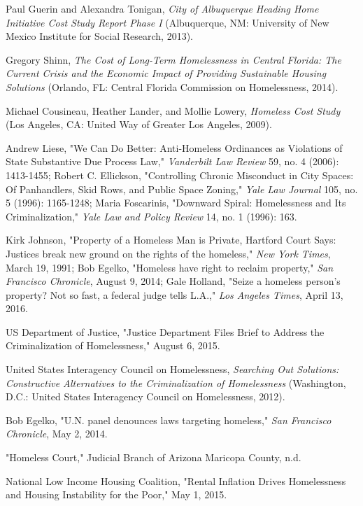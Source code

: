 \documentclass[fontset=fandol, a4paper, 12pt, openright]{ctexbook}
\begin{document}
\begin{enumerate}[label={[\arabic*]}]
    \item Paul Guerin and Alexandra Tonigan, \textit{City of Albuquerque Heading Home Initiative Cost Study Report Phase I} (Albuquerque, NM: University of New Mexico Institute for Social Research, 2013).
    \item Gregory Shinn, \textit{The Cost of Long-Term Homelessness in Central Florida: The Current Crisis and the Economic Impact of Providing Sustainable Housing Solutions} (Orlando, FL: Central Florida Commission on Homelessness, 2014).
    \item Michael Cousineau, Heather Lander, and Mollie Lowery, \textit{Homeless Cost Study} (Los Angeles, CA: United Way of Greater Los Angeles, 2009).
    \item Andrew Liese, "We Can Do Better: Anti-Homeless Ordinances as Violations of State Substantive Due Process Law," \textit{Vanderbilt Law Review} 59, no. 4 (2006): 1413-1455; Robert C. Ellickson, "Controlling Chronic Misconduct in City Spaces: Of Panhandlers, Skid Rows, and Public Space Zoning," \textit{Yale Law Journal} 105, no. 5 (1996): 1165-1248; Maria Foscarinis, "Downward Spiral: Homelessness and Its Criminalization," \textit{Yale Law and Policy Review} 14, no. 1 (1996): 163.
    \item Kirk Johnson, "Property of a Homeless Man is Private, Hartford Court Says: Justices break new ground on the rights of the homeless," \textit{New York Times}, March 19, 1991; Bob Egelko, "Homeless have right to reclaim property," \textit{San Francisco Chronicle}, August 9, 2014; Gale Holland, "Seize a homeless person's property? Not so fast, a federal judge tells L.A.," \textit{Los Angeles Times}, April 13, 2016.
    \item US Department of Justice, "Justice Department Files Brief to Address the Criminalization of Homelessness," August 6, 2015.
    \item United States Interagency Council on Homelessness, \textit{Searching Out Solutions: Constructive Alternatives to the Criminalization of Homelessness} (Washington, D.C.: United States Interagency Council on Homelessness, 2012).
    \item Bob Egelko, "U.N. panel denounces laws targeting homeless," \textit{San Francisco Chronicle}, May 2, 2014.
    \item "Homeless Court," Judicial Branch of Arizona Maricopa County, n.d.
    \item National Low Income Housing Coalition, "Rental Inflation Drives Homelessness and Housing Instability for the Poor," May 1, 2015.

\end{enumerate}
\end{document}
